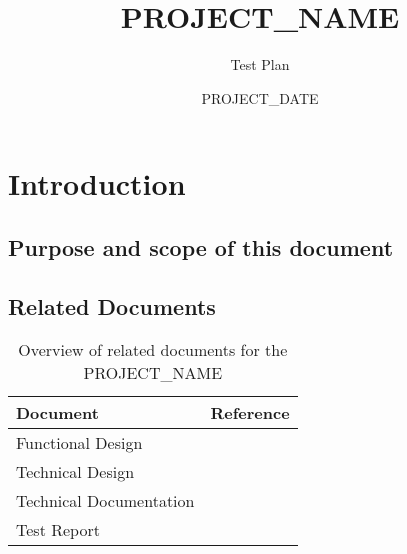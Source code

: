 \documentclass[signature]{deltares_report}
\begin{document}
\pagestyle{empty}
\cleardoublepage
%

\newcommand{\ProgramName}{PROJECT_NAME\xspace}

\title{\ProgramName}
\subtitle{Test Plan}
\classification{-}

\date{PROJECT_DATE}



\summary{}

\revieweri{}
\approvali{}

\disclaimer{}



\chapter{Introduction} 
\label{chapterIntroduction}

\section{Purpose and scope of this document} \label{sec:PurposeAndScope}

\section{Related Documents}
\label{sec:RelatedDocuments}
\bigskip
\begin{longtable}{|p{}|p{}|}
\caption{Overview of related documents for the \ProgramName \label{tab:RelatedDocuments}}\\	\hline
		\hline 
		\textbf{Document} & \textbf{Reference} \\
		\hline 
		\hline 
		Functional Design & \citep{PROJECT_NAME_FunctionalDesignPROJECT_YEAR} \\
		Technical Design & \citep{PROJECT_NAME_TechnicalDesignPROJECT_YEAR} \\
		Technical Documentation & \citep{PROJECT_NAME_TechnicalDocumentationPROJECT_YEAR} \\
		Test Report & \citep{PROJECT_NAME_TestReportPROJECT_YEAR}  \\
    \hline			
\end{longtable}
\end{document}
